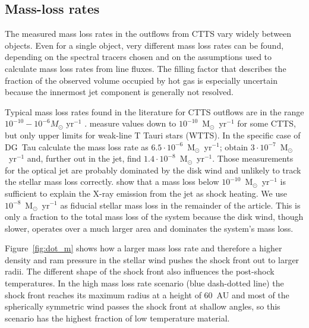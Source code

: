 \documentclass[manuscript]{aastex}
\begin{document}
\subsection{Mass-loss rates}
\label{sect:masslossrates}
The measured mass loss rates in the outflows from CTTS vary widely between objects.  Even for a single object, very different mass loss rates can be found, depending on the spectral tracers chosen and on the assumptions used to calculate mass loss rates from line fluxes. The filling factor that describes the fraction of the observed volume occupied by hot gas is especially uncertain because the innermost jet component is generally not resolved.

Typical mass loss rates found in the literature for CTTS outflows are in the range $10^{-10}-10^{-6}M_{\odot}\textrm{ yr}^{-1}$ \citep{1999A&A...342..717B,2006A&A...456..189P}. \citet{2006ApJ...646..319E} measure values down to $10^{-10}$~M$_{\odot}$~yr$^{-1}$ for some CTTS, but only upper limits for weak-line T Tauri stars (WTTS). In the specific case of DG~Tau \citet{1997A&A...327..671L} calculate the  mass loss rate as $6.5\cdot 10^{-6}$~M$_{\odot}$~yr$^{-1}$; \citet{1995ApJ...452..736H}
obtain $3\cdot 10^{-7}$~M$_{\odot}$~yr$^{-1}$ and, further out in the jet, \citet{2000A&A...356L..41L} find $1.4\cdot 10^{-8}$~M$_{\odot}$~yr$^{-1}$. Those measurements for the optical jet are probably dominated by the disk wind \citep[e.g.][]{2014arXiv1404.0728W} and unlikely to track the stellar mass loss correctly.
\citet{2009A&A...493..579G} show that a mass loss below $10^{-10}$~M$_{\odot}$~yr$^{-1}$ is sufficient to explain the X-ray emission from the jet as shock heating.
We use $10^{-8}$~M$_{\odot}$~yr$^{-1}$ as fiducial stellar mass loss in the remainder of the article. This is only a fraction to the total mass loss of the system because the disk wind, though slower, operates over a much larger area and dominates the system's mass loss.

Figure~\ref{fig:dot_m} shows how a larger mass loss rate and therefore a higher density and ram pressure in the stellar wind pushes the shock front out to larger radii. The different shape of the shock front also influences the post-shock temperatures. In the high mass loss rate scenario (blue dash-dotted line) the shock front reaches its maximum radius at a height of 60~AU and most of the spherically symmetric wind passes the shock front at shallow angles, so this scenario has the highest fraction of low temperature material.
\end{document}
